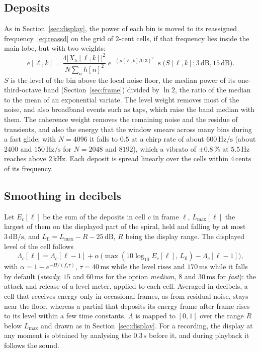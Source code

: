 \documentclass[10pt,a4paper,twocolumn]{article}
\newcommand{\Hz}{\,\mathrm{Hz}}
\newcommand{\dB}{\,\mathrm{dB}}
\newcommand{\s}{\,\mathrm{s}}
\newcommand{\ms}{\,\mathrm{ms}}
\newcommand{\ct}{\,\mathrm{cents}}
\newcommand{\sst}{\operatorname{s}}
\begin{document}
\subsection{Deposits}

As in Section~\ref{sec:display}, the power of each bin is moved to its reassigned frequency~\eqref{eq:reassd} on the grid of $2$-cent cells, if that frequency lies inside the main lobe, but with two weights:
\begin{equation}
e[\ell,k] = \frac{4|X_h[\ell,k]|^2}{N\sum_n h[n]^2}\; e^{-(\mu[\ell,k]/0.3)^2}\; \sst\bigl(S[\ell,k]; 3\dB, 15\dB\bigr).
\label{eq:dep}
\end{equation}
$S$ is the level of the bin above the local noise floor, the median power of its one-third-octave band (Section~\ref{sec:frame}) divided by $\ln 2$, the ratio of the median to the mean of an exponential variate. The level weight removes most of the noise, and also broadband events such as taps, which raise the band median with them. The coherence weight removes the remaining noise and the residue of transients, and also the energy that the window smears across many bins during a fast glide; with $N = 4096$ it falls to $0.5$ at a chirp rate of about $600\Hz/\mathrm{s}$ (about $2400$ and $150\Hz/\mathrm{s}$ for $N = 2048$ and $8192$), which a vibrato of $\pm 0.8\,\%$ at $5.5\Hz$ reaches above $2\,\mathrm{kHz}$. Each deposit is spread linearly over the cells within $4\ct$ of its frequency.

\subsection{Smoothing in decibels}

Let $E_c[\ell]$ be the sum of the deposits in cell $c$ in frame $\ell$, $L_{\max}[\ell]$ the largest of them on the displayed part of the spiral, held and falling by at most $3\dB/\mathrm{s}$, and $L_{\mathrm{fl}} = L_{\max} - R - 25\dB$, $R$ being the display range. The displayed level of the cell follows
\begin{equation}
\Lambda_c[\ell] = \Lambda_c[\ell-1] + \alpha\,\bigl(\max(10\log_{10} E_c[\ell],\, L_{\mathrm{fl}}) - \Lambda_c[\ell-1]\bigr),
\label{eq:ballistics}
\end{equation}
with $\alpha = 1 - e^{-H/(f_s\tau)}$, $\tau = 40\ms$ while the level rises and $170\ms$ while it falls by default (\emph{steady}; $15$ and $60\ms$ for the option \emph{medium}, $8$ and $30\ms$ for \emph{fast}): the attack and release of a level meter, applied to each cell. Averaged in decibels, a cell that receives energy only in occasional frames, as from residual noise, stays near the floor, whereas a partial that deposits its energy frame after frame rises to its level within a few time constants. $\Lambda$ is mapped to $[0,1]$ over the range $R$ below $L_{\max}$ and drawn as in Section~\ref{sec:display}. For a recording, the display at any moment is obtained by analysing the $0.3\s$ before it, and during playback it follows the sound.
\end{document}
